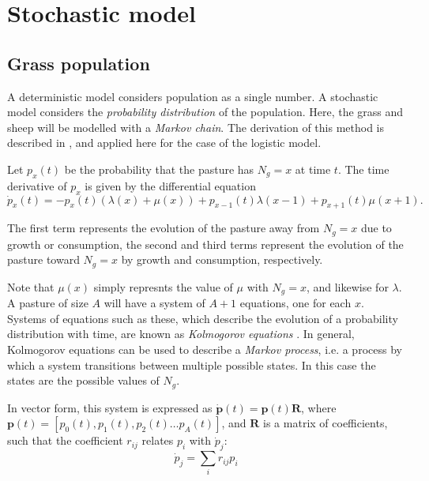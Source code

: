 \documentclass{article}
\theoremstyle{theorem}
\theoremstyle{definition}
\begin{document}
\section{Stochastic model}

\subsection{Grass population}
A deterministic model considers population as a single number. A stochastic model considers the \textit{probability distribution} of the population. Here, the grass and sheep will be modelled with a \textit{Markov chain}. The derivation of this method is described in \cite{matis_kiffe}, and applied here for the case of the logistic model.

Let $p_x(t)$ be the probability that the pasture has $N_g=x$ at time $t$. The time derivative of $p_x$ is given by the differential equation
\begin{equation}
    \label{p_dot}
    \dot{p}_x(t)=-p_x(t)(\lambda(x)+\mu(x))+p_{x-1}(t)\lambda(x-1)+p_{x+1}(t)\mu(x+1).
\end{equation}

The first term represents the evolution of the pasture away from $N_g=x$ due to growth or consumption, the second and third terms represent the evolution of the pasture toward $N_g=x$ by growth and consumption, respectively.

Note that $\mu(x)$ simply represnts the value of $\mu$ with $N_g=x$, and likewise for $\lambda$. A pasture of size $A$ will have a system of $A+1$ equations, one for each $x$. Systems of equations such as these, which describe the evolution of a probability distribution with time, are known as \textit{Kolmogorov equations} \cite{matis_kiffe}. In general, Kolmogorov equations can be used to describe a \textit{Markov process}, i.e. a process by which a system transitions between multiple possible states. In this case the states are the possible values of $N_g$.


In vector form, this system is expressed as $\dot{\mathbf{p}}(t)=\mathbf{p}(t)\mathbf{R}$, where \linebreak $\mathbf{p}(t)=\left[p_0(t), p_1(t), p_2(t) \dots p_A(t)\right]$, and $\mathbf{R}$ is a matrix of coefficients, such that the coefficient $r_{ij}$ relates $p_i$ with $\dot{p}_j$:
\begin{equation*}
    \dot{p}_j=\sum_{i}r_{ij}p_i
\end{equation*}
\end{document}
